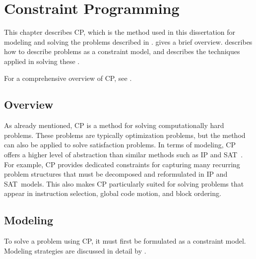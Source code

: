 %

\chapter{Constraint Programming}

This chapter describes \glsdesc{CP}, which is the method used in this
dissertation for modeling and solving the problems described in
.
%
 gives a brief overview.
%
 describes how to describe problems as a \gls{constraint
  model}, and  describes the techniques applied in
solving these .

For a comprehensive overview of \gls{CP}, see \cite{RossiEtAl:2006}.



\section{Overview}

As already mentioned, \glsdesc{CP} is a method for solving computationally hard
problems.
%
These problems are typically optimization problems, but the method can also be
applied to solve satisfaction problems.
%
In terms of modeling, \gls{CP} offers a higher level of abstraction than similar
methods such as \gls{IP} and \gls{SAT}~\cite{BiereEtAl:2009}.
%
For example, \gls{CP} provides dedicated constraints for capturing many
recurring problem structures that must be decomposed and reformulated in
\gls{IP} and \gls{SAT}~models.
%
This also makes \gls{CP} particularly suited for solving problems that appear in
\gls{instruction selection}, \gls{global code motion}, and \gls{block ordering}.



\section{Modeling}

To solve a problem using \gls{CP}, it must first be formulated as a
\gls{constraint model}.
%
Modeling strategies are discussed in detail by \textcite{Smith:2006}.

